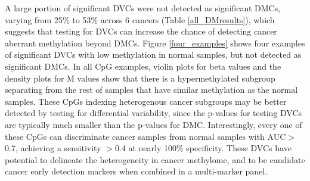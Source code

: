 \documentclass{statsoc}
\begin{document}


A large portion of significant DVCs were not detected as significant DMCs, varying from  25\% to 53\% across 6 cancers (Table \ref{all_DMresults}), which suggests that testing for DVCs can increase the chance of detecting cancer aberrant methylation beyond DMCs. Figure \ref{four_examples} shows four examples of significant DVCs with low methylation in normal samples, but not detected as significant DMCs. In all CpG examples, violin plots for beta values and the density plots for M values show that there is a hypermethylated subgroup separating from the rest of samples that have similar methylation as the normal samples. These CpGs indexing heterogenous cancer subgroups may be better detected by testing for differential variability, since the p-values for testing DVCs are typically much smaller than the p-values for DMC. Interestingly, every one of these CpGs can discriminate cancer samples from normal samples with AUC$>$0.7, achieving a sensitivity $>$0.4 at nearly 100\% specificity. These DVCs have potential to delineate the heterogeneity in cancer methylome, and to be candidate cancer early detection markers when combined in a multi-marker panel.
\end{document}
